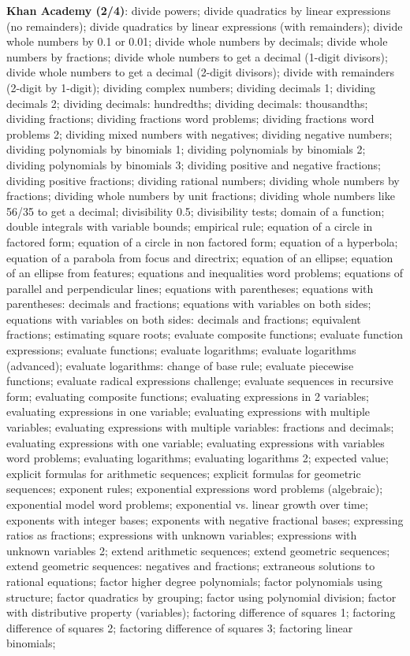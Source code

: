 \documentclass{article}
\begin{document}
\begin{figure*}
\textbf{Khan Academy (2/4)}:
divide powers; divide quadratics by linear expressions (no remainders); divide quadratics by linear expressions (with remainders); divide whole numbers by 0.1 or 0.01; divide whole numbers by decimals; divide whole numbers by fractions; divide whole numbers to get a decimal (1-digit divisors); divide whole numbers to get a decimal (2-digit divisors); divide with remainders (2-digit by 1-digit); dividing complex numbers; dividing decimals 1; dividing decimals 2; dividing decimals: hundredths; dividing decimals: thousandths; dividing fractions; dividing fractions word problems; dividing fractions word problems 2; dividing mixed numbers with negatives; dividing negative numbers; dividing polynomials by binomials 1; dividing polynomials by binomials 2; dividing polynomials by binomials 3; dividing positive and negative fractions; dividing positive fractions; dividing rational numbers; dividing whole numbers by fractions; dividing whole numbers by unit fractions; dividing whole numbers like 56/35 to get a decimal; divisibility 0.5; divisibility tests; domain of a function; double integrals with variable bounds; empirical rule; equation of a circle in factored form; equation of a circle in non factored form; equation of a hyperbola; equation of a parabola from focus and directrix; equation of an ellipse; equation of an ellipse from features; equations and inequalities word problems; equations of parallel and perpendicular lines; equations with parentheses; equations with parentheses: decimals and fractions; equations with variables on both sides; equations with variables on both sides: decimals and fractions; equivalent fractions; estimating square roots; evaluate composite functions; evaluate function expressions; evaluate functions; evaluate logarithms; evaluate logarithms (advanced); evaluate logarithms: change of base rule; evaluate piecewise functions; evaluate radical expressions challenge; evaluate sequences in recursive form; evaluating composite functions; evaluating expressions in 2 variables; evaluating expressions in one variable; evaluating expressions with multiple variables; evaluating expressions with multiple variables: fractions and decimals; evaluating expressions with one variable; evaluating expressions with variables word problems; evaluating logarithms; evaluating logarithms 2; expected value; explicit formulas for arithmetic sequences; explicit formulas for geometric sequences; exponent rules; exponential expressions word problems (algebraic); exponential model word problems; exponential vs. linear growth over time; exponents with integer bases; exponents with negative fractional bases; expressing ratios as fractions; expressions with unknown variables; expressions with unknown variables 2; extend arithmetic sequences; extend geometric sequences; extend geometric sequences: negatives and fractions; extraneous solutions to rational equations; factor higher degree polynomials; factor polynomials using structure; factor quadratics by grouping; factor using polynomial division; factor with distributive property (variables); factoring difference of squares 1; factoring difference of squares 2; factoring difference of squares 3; factoring linear binomials; 
\end{figure*}
\end{document}
